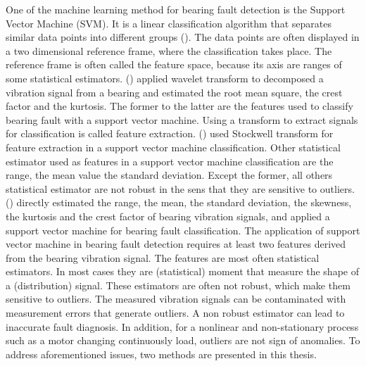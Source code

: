 \documentclass[../Main/thesis.tex]{subfiles}
\begin{document}
One of the machine learning method for bearing fault detection is the Support Vector Machine (SVM). It is a linear classification algorithm that separates similar data points into different groups (\cite{vapnik1995}). The data points are  often displayed in a two dimensional reference frame, where the classification takes place. The reference frame is often called the feature space, because its axis are ranges of some statistical estimators. (\cite{konar2011}) applied wavelet transform to decomposed a vibration signal from a bearing and estimated the root mean square, the crest factor and the kurtosis. The former to the latter are the features used to classify bearing fault with a support vector machine. Using a transform to extract signals for classification is called feature extraction. (\cite{singh2018}) used Stockwell transform for feature extraction in a support vector machine classification. Other statistical estimator used as features in a support vector machine classification are the range, the mean value the standard deviation. Except the former, all others statistical estimator are not robust in the sens that they are sensitive to outliers. (\cite{kankar2010}) directly estimated the range, the mean, the standard deviation, the skewness, the kurtosis and the crest factor of bearing vibration signals, and applied a support vector machine for bearing fault classification.
\justify
\justify
The application of support vector machine in bearing fault detection requires at least two features derived from the bearing vibration signal. The features are most often statistical estimators. In most cases they are (statistical) moment that measure the shape of a (distribution) signal. These estimators are often not robust, which make them sensitive to outliers. The measured vibration signals can be contaminated with measurement errors that generate outliers. A non robust estimator can lead to inaccurate fault diagnosis. In addition, for a nonlinear and non-stationary process such as a motor changing continuously load, outliers are not sign of anomalies. To address aforementioned issues, two methods are presented in this thesis. 




\end{document}
